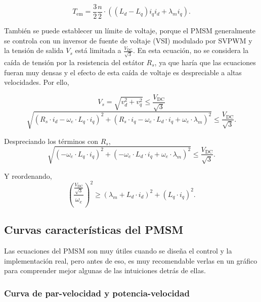 \begin{equation}
T_{\text{em}} = \frac{3}{2}\frac{n}{2}\cdot((L_d - L_q) i_q i_d + \lambda_m i_q) \text{.}
\label{eq_tq_dq} 
\end{equation}

También se puede establecer un límite de voltaje, porque el PMSM generalmente se controla con un inversor de fuente de voltaje (VSI) modulado por SVPWM y la tensión de salida $V_s$ está limitada a \(\frac{V_{\text{DC}}}{\sqrt{3}}\). En esta ecuación, no se considera la caída de tensión por la resistencia del estátor \(R_s\), ya que haría que las ecuaciones fueran muy densas y el efecto de esta caída de voltaje es despreciable a altas velocidades. Por ello,

\begin{equation}
V_s = \sqrt{v_d^2 + v_q^2} \leq \frac{V_{\text{DC}}}{\sqrt{3}}
\end{equation}
\begin{equation}
	\sqrt{\left(R_s\cdot i_d - \omega_e \cdot L_q \cdot i_q\right)^2 + \left(R_s\cdot i_q - \omega_e \cdot L_d \cdot i_q + \omega_e \cdot \lambda_m\right)^2} \leq \frac{V_{\text{DC}}}{\sqrt{3}} \text{.}
\end{equation}

Despreciando los términos con \(R_s\),
\begin{equation}
	\sqrt{\left(- \omega_e \cdot L_q \cdot i_q\right)^2 + \left(- \omega_e \cdot L_d \cdot i_q + \omega_e \cdot \lambda_m\right)^2} \leq \frac{V_{\text{DC}}}{\sqrt{3}} \text{.}
\end{equation}
 
Y reordenando,
\begin{equation}
	\left(\frac{\frac{V_{\text{DC}}}{\sqrt{3}}}{\omega_e}\right)^2 \geq \left(\lambda_m+L_d\cdot i_d\right)^2+(L_q\cdot i_q)^2 \text{.}
	\label{eq_vle_dq}
\end{equation}

\subsection{Curvas características del PMSM}

Las ecuaciones del PMSM son muy útiles cuando se diseña el control y la implementación real, pero antes de eso, es muy recomendable verlas en un gráfico para comprender mejor algunas de las intuiciones detrás de ellas.

\subsubsection{Curva de par-velocidad y potencia-velocidad}

